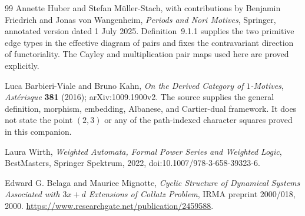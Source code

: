 \begin{thebibliography}{99}
Annette Huber and Stefan M\"uller-Stach, with contributions by Benjamin
Friedrich and Jonas von Wangenheim,
\emph{Periods and Nori Motives}, Springer, annotated version dated
1 July 2025.
Definition~9.1.1 supplies the two primitive edge types in the effective
diagram of pairs and fixes the contravariant direction of functoriality.
The Cayley and multiplication pair maps used here are proved explicitly.

Luca Barbieri-Viale and Bruno Kahn,
\emph{On the Derived Category of $1$-Motives},
\emph{Ast\'erisque} \textbf{381} (2016); arXiv:1009.1900v2.
The source supplies the general definition, morphism, embedding, Albanese,
and Cartier-dual framework.  It does not state the point $(2,3)$ or any of
the path-indexed character squares proved in this companion.

Laura Wirth,
\emph{Weighted Automata, Formal Power Series and Weighted Logic},
BestMasters, Springer Spektrum, 2022,
doi:10.1007/978-3-658-39323-6.

Edward G. Belaga and Maurice Mignotte,
\emph{Cyclic Structure of Dynamical Systems Associated with $3x+d$
Extensions of Collatz Problem}, IRMA preprint 2000/018, 2000.
\url{https://www.researchgate.net/publication/2459588}.

\end{thebibliography}
